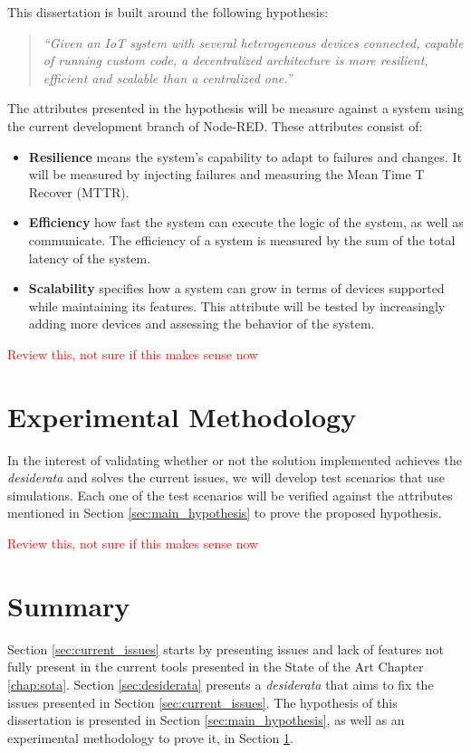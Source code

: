 This dissertation is built around the following hypothesis:

\begin{quote}
    \emph{``Given an IoT system with several heterogeneous devices connected, capable of running custom code, a decentralized architecture is more resilient, efficient and scalable than a centralized one.''}
\end{quote}

The attributes presented in the hypothesis will be measure against a system using the current development branch of Node-RED. These attributes consist of:

\begin{itemize}
    \item \textbf{Resilience} means the system's capability to adapt to failures and changes. It will be measured by injecting failures and measuring the Mean Time T Recover (MTTR).
    \item \textbf{Efficiency} how fast the system can execute the logic of the system, as well as communicate. The efficiency of a system is measured by the sum of the total latency of the system. 
    \item \textbf{Scalability} specifies how a system can grow in terms of devices supported while maintaining its features. This attribute will be tested by increasingly adding more devices and assessing the behavior of the system.
\end{itemize}

\textcolor{red}{Review this, not sure if this makes sense now}

\section{Experimental Methodology}\label{sec:exp_meth}

In the interest of validating whether or not the solution implemented achieves the \emph{desiderata} and solves the current issues, we will develop test scenarios that use simulations. Each one of the test scenarios will be verified against the attributes mentioned in Section \ref{sec:main_hypothesis} to prove the proposed hypothesis.

\textcolor{red}{Review this, not sure if this makes sense now}

\section{Summary}\label{sec:stat_summary}

Section \ref{sec:current_issues} starts by presenting issues and lack of features not fully present in the current tools presented in the State of the Art Chapter \ref{chap:sota}. Section \ref{sec:desiderata} presents a \textit{desiderata} that aims to fix the issues presented in Section \ref{sec:current_issues}. The hypothesis of this dissertation is presented in Section \ref{sec:main_hypothesis}, as well as an experimental methodology to prove it, in Section \ref{sec:exp_meth}.
